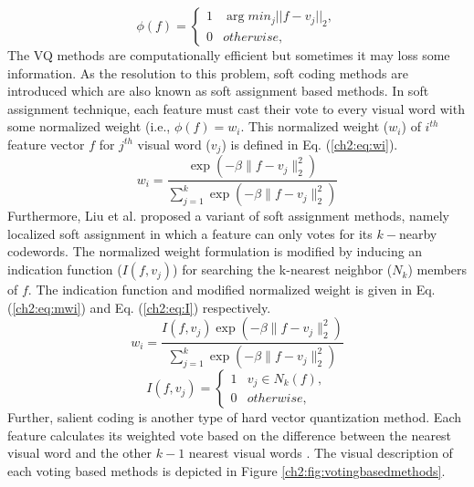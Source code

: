\begin{itemize}
\begin{equation}\label{ch2:eq:f}
\phi(f)=\begin{cases}1 & \arg min_j ||f-v_j||_2, \\0 & otherwise,\end{cases}
\end{equation}
The VQ methods are computationally efficient but sometimes it may loss some information. As the resolution to this problem, soft coding methods are introduced which are also known as soft assignment based methods. In soft assignment technique, each feature must cast their vote to every visual word with some normalized weight (i.e., $\phi(f)=w_i$. This normalized weight ($w_i$) of $i^{th}$ feature vector $f$ for $j^{th}$ visual word ($v_j$) is defined in Eq. (\ref{ch2:eq:wi}).
\begin{equation}\label{ch2:eq:wi}
w_i=\frac{\exp(-\beta\parallel f- v_j\parallel^2_2)}{\sum_{j=1}^k\exp(-\beta\parallel f- v_j\parallel^2_2)}
\end{equation}
Furthermore, Liu et al.  \cite{Liu2011} proposed a variant of soft assignment methods, namely localized soft assignment in which a feature can only votes for its $k-$nearby codewords. The normalized weight formulation is modified by inducing an indication function ($I(f,v_j)$) for searching the k-nearest neighbor ($N_k$) members of $f$. The indication function and modified normalized weight is given in Eq. (\ref{ch2:eq:mwi}) and Eq. (\ref{ch2:eq:I}) respectively.
\begin{equation}\label{ch2:eq:mwi}
w_i=\frac{I(f,v_j)\exp(-\beta\parallel f- v_j\parallel^2_2)}{\sum_{j=1}^k\exp(-\beta\parallel f- v_j\parallel^2_2)}
\end{equation}
\begin{equation}\label{ch2:eq:I}
 I(f,v_j)=\begin{cases}1 &  v_j \in N_k(f), \\0 & otherwise,\end{cases}
\end{equation}
Further, salient coding is another type of hard vector quantization method. Each feature calculates its weighted vote based on the difference between the nearest visual word and the other $k-1$ nearest visual words \cite{Huang2011salient}. 
The visual description of each voting based methods is depicted in Figure \ref{ch2:fig:votingbasedmethods}.


\end{itemize}
